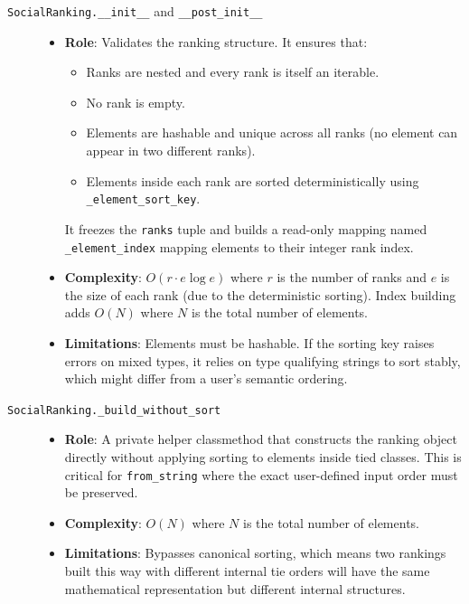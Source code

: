 \documentclass[11pt]{article}
\newcommand{\pathitem}[1]{\texttt{#1}}
\begin{document}
\begin{description}
  \item[\pathitem{SocialRanking.\_\_init\_\_} and \pathitem{\_\_post\_init\_\_}]
  \begin{itemize}
    \item \textbf{Role}: Validates the ranking structure. It ensures that:
    \begin{itemize}
      \item Ranks are nested and every rank is itself an iterable.
      \item No rank is empty.
      \item Elements are hashable and unique across all ranks (no element can appear in two different ranks).
      \item Elements inside each rank are sorted deterministically using \pathitem{\_element\_sort\_key}.
    \end{itemize}
    It freezes the \pathitem{ranks} tuple and builds a read-only mapping named \pathitem{\_element\_index} mapping elements to their integer rank index.
    \item \textbf{Complexity}: $O(r \cdot e \log e)$ where $r$ is the number of ranks and $e$ is the size of each rank (due to the deterministic sorting). Index building adds $O(N)$ where $N$ is the total number of elements.
    \item \textbf{Limitations}: Elements must be hashable. If the sorting key raises errors on mixed types, it relies on type qualifying strings to sort stably, which might differ from a user's semantic ordering.
  \end{itemize}

  \item[\pathitem{SocialRanking.\_build\_without\_sort}]
  \begin{itemize}
    \item \textbf{Role}: A private helper classmethod that constructs the ranking object directly without applying sorting to elements inside tied classes. This is critical for \pathitem{from\_string} where the exact user-defined input order must be preserved.
    \item \textbf{Complexity}: $O(N)$ where $N$ is the total number of elements.
    \item \textbf{Limitations}: Bypasses canonical sorting, which means two rankings built this way with different internal tie orders will have the same mathematical representation but different internal structures.
  \end{itemize}


\end{description}
\end{document}
